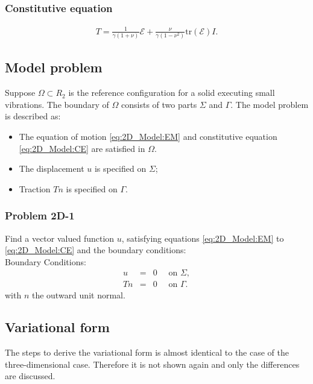 \documentclass[../../main.tex]{subfiles}
\begin{document}
\subsubsection{Constitutive equation}\label{sssec:2D_Model:ConstitutiveEquation}
\begin{eqnarray}
	T = \frac{1}{\gamma(1+\nu)}\mathcal{E} + \frac{\nu}{\gamma(1-\nu^2)}\textrm{tr}(\mathcal{E}) I. \label{eq:2D_Model:CE}
\end{eqnarray}

\subsection{Model problem}\label{ssec:2D_Model:ModelProblem}
Suppose $\Omega \subset R_2$ is the reference configuration for a solid executing small vibrations. The boundary of $\Omega$ consists of two parts $\Sigma$ and $\Gamma$. The model problem is described as:
\begin{itemize}
    \item[] The equation of motion \eqref{eq:2D_Model:EM} and constitutive equation \eqref{eq:2D_Model:CE} are satisfied in $\Omega$.
	\item[] The displacement $u$ is specified on $\Sigma$;
	\item[] Traction $Tn$ is specified on $\Gamma$.
\end{itemize}

\subsubsection{Problem 2D-1}\label{sssec:2D_Model:Problem2D1}
Find a vector valued function $u$, satisfying equations \eqref{eq:2D_Model:EM} to \eqref{eq:2D_Model:CE} and the boundary conditions:\\

Boundary Conditions:\\
\begin{eqnarray*}
	u & = & 0 \quad \textrm{ on } \Sigma,\\
	Tn & = & 0 \quad \textrm{ on } \Gamma.
\end{eqnarray*} with $n$ the outward unit normal.

\subsection{Variational form}\label{ssec:2D_Model:VariationalForm}
The steps to derive the variational form is almost identical to the case of the three-dimensional case. Therefore it is not shown again and only the differences are discussed. \\
\end{document}
